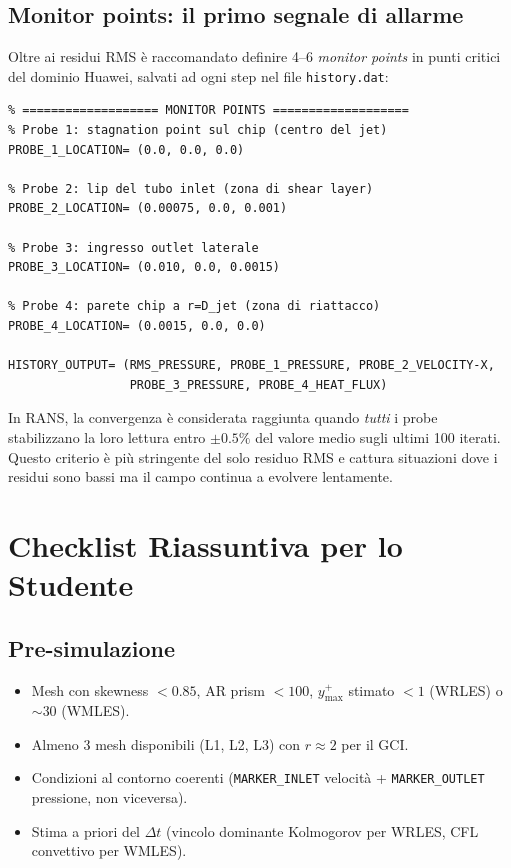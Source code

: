 \documentclass[11pt,a4paper]{article}
\newcommand{\ttcfg}[1]{\texttt{\color{codegray}#1}}
\begin{document}
\subsection{Monitor points: il primo segnale di allarme}

Oltre ai residui RMS è raccomandato definire 4--6 \emph{monitor points}
in punti critici del dominio Huawei, salvati ad ogni step nel file
\texttt{history.dat}:

\begin{lstlisting}
% =================== MONITOR POINTS ===================
% Probe 1: stagnation point sul chip (centro del jet)
PROBE_1_LOCATION= (0.0, 0.0, 0.0)

% Probe 2: lip del tubo inlet (zona di shear layer)
PROBE_2_LOCATION= (0.00075, 0.0, 0.001)

% Probe 3: ingresso outlet laterale
PROBE_3_LOCATION= (0.010, 0.0, 0.0015)

% Probe 4: parete chip a r=D_jet (zona di riattacco)
PROBE_4_LOCATION= (0.0015, 0.0, 0.0)

HISTORY_OUTPUT= (RMS_PRESSURE, PROBE_1_PRESSURE, PROBE_2_VELOCITY-X,
                 PROBE_3_PRESSURE, PROBE_4_HEAT_FLUX)
\end{lstlisting}

In RANS, la convergenza è considerata raggiunta quando \emph{tutti} i
probe stabilizzano la loro lettura entro $\pm 0.5\%$ del valore medio
sugli ultimi 100 iterati. Questo criterio è più stringente del solo
residuo RMS e cattura situazioni dove i residui sono bassi ma il
campo continua a evolvere lentamente.

\section{Checklist Riassuntiva per lo Studente}
\label{sec:checklist}

\subsection{Pre-simulazione}

\begin{itemize}
  \item[\textbullet] Mesh con skewness $< 0.85$, AR prism $< 100$,
    $y^+_{\max}$ stimato $< 1$ (WRLES) o $\sim 30$ (WMLES).
  \item[\textbullet] Almeno 3 mesh disponibili (L1, L2, L3) con
    $r \approx 2$ per il GCI.
  \item[\textbullet] Condizioni al contorno coerenti
    (\ttcfg{MARKER\_INLET} velocità + \ttcfg{MARKER\_OUTLET} pressione,
    non viceversa).
  \item[\textbullet] Stima a priori del $\Delta t$ (vincolo dominante
    Kolmogorov per WRLES, CFL convettivo per WMLES).
\end{itemize}
\end{document}
